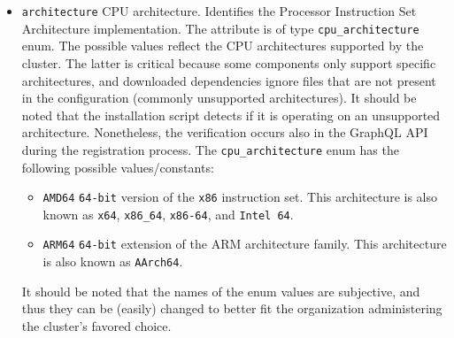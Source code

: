 \begin{itemize}
  \item \texttt{architecture}
    \newline
    CPU architecture.
    \newline
    Identifies the Processor Instruction Set Architecture implementation.
    \newline
    The attribute is of type \texttt{cpu\_architecture} enum. The possible
    values reflect the CPU architectures supported by the cluster. The latter is
    critical because some components only support specific architectures, and
    downloaded dependencies ignore files that are not present in the
    configuration (commonly unsupported architectures). It should be noted that the
    installation script detects if it is operating on an unsupported architecture.
    Nonetheless, the verification occurs also in the GraphQL API during the registration
    process.
    \newline
    The \texttt{cpu\_architecture} enum has the following possible values/constants:
    \begin{itemize}
      \item \texttt{AMD64}
        \newline
        \texttt{64-bit} version of the \texttt{x86} instruction set.
        \newline
        This architecture is also known as \texttt{x64}, \texttt{x86\_64}, \texttt{x86-64},
        and \texttt{Intel 64}.

      \item \texttt{ARM64}
        \newline
        \texttt{64-bit} extension of the ARM architecture family.
        \newline
        This architecture is also known as \texttt{AArch64}.
    \end{itemize}
    It should be noted that the names of the enum values are subjective, and thus
    they can be (easily) changed to better fit the organization administering the
    cluster's favored choice.


\end{itemize}
